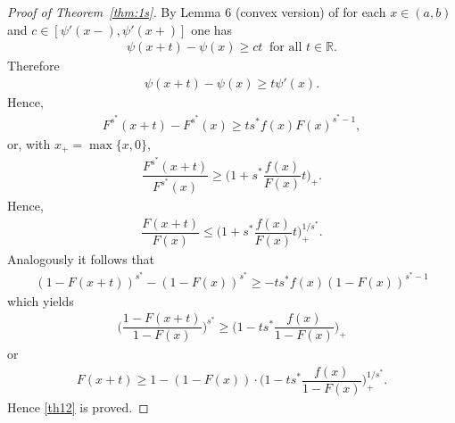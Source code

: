 \documentclass[11pt]{amsart}
\numberwithin{equation}{section}
\newcommand{\RR}{\mathbb{R}}
\theoremstyle{definition}\newtheorem{definition}{Definition}
\theoremstyle{remark}\newtheorem{assumption}{Assumption}
\theoremstyle{remark}\newtheorem{remark}{Remark}
\theoremstyle{definition}\newtheorem{example}{Example}
\theoremstyle{plain}\newtheorem{question}{Question}
\theoremstyle{plain}\newtheorem{theorem}{Theorem}
\theoremstyle{plain}\newtheorem{lemma}{Lemma}
\theoremstyle{plain}\newtheorem{proposition}{Proposition}
\theoremstyle{plain}\newtheorem{corollary}{Corollary}
\theoremstyle{plain}\newtheorem{conjecture}{Conjecture}
\begin{document}
\begin{proof}[Proof of Theorem~\ref{thm:1s}]
By Lemma 6 (convex version) 
    of \cite{DuembgenKW:2017} for each $x\in(a,b)$ and $c\in[\psi'(x-),\psi'(x+)]$ one has
    \begin{eqnarray*}
    \psi(x+t) -\psi(x)\geq ct\ \text{ for all }t\in\RR.
    \end{eqnarray*}
    Therefore
    \begin{eqnarray*}
    \psi(x+t)-\psi(x)\geq t \psi'(x).
    \end{eqnarray*}
    Hence, 
    \begin{eqnarray*}
    F^{s^*}(x+t)-F^{s^*}(x)\geq ts^{*}f(x)F(x)^{s^*-1} ,
    \end{eqnarray*}
    or, with $x_{+}=\max\{x,0\}$,
    \begin{eqnarray*}
    \dfrac{F^{s^*}(x+t)}{F^{s^*}(x)}\geq\bigg ( 1+s^*\dfrac{f(x)}{F(x)}t\bigg )_{+}.
    \end{eqnarray*}
    Hence,
\begin{eqnarray*}
    \dfrac{F(x+t)}{F(x)}\leq\bigg ( 1+s^*\dfrac{f(x)}{F(x)}t\bigg )_{+}^{1/s^*}.
\end{eqnarray*}
     Analogously it follows that
\begin{eqnarray*}
    (1-F(x+t))^{s^*}-(1-F(x))^{s^*} \geq -ts^*f(x)(1-F(x))^{s^*-1}
\end{eqnarray*}
   which yields
\begin{eqnarray*}
    \bigg(\dfrac{1-F(x+t)}{1-F(x)}\bigg )^{s^*}\geq \bigg (1-ts^*\dfrac{f(x)}{1-F(x)}\bigg)_{+}
\end{eqnarray*}
    or
\begin{eqnarray*}
    F(x+t)\geq 1-(1-F(x))\cdot \bigg (1-ts^*\dfrac{f(x)}{1-F(x)}\bigg)_{+}^{1/s^*}.
\end{eqnarray*}
    Hence \eqref{th12} is proved.
    

\end{proof}
\end{document}
